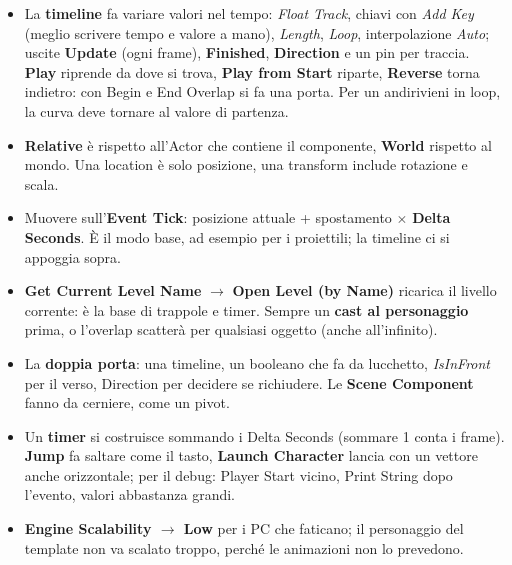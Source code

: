 \begin{itemize}
{        Basic}, poi duplicati con Ctrl+C, Ctrl+V. \textbf{Fab}: asset, plugin,
        progetti completi; filtrare per formato Unreal Engine e gratuito; tre
        pacchetti gratuiti a tempo ogni quindici giorni; gli asset vanno
        \textbf{solo avanti di versione, mai indietro}.
  \item La \textbf{timeline} fa variare valori nel tempo: \emph{Float Track},
        chiavi con \emph{Add Key} (meglio scrivere tempo e valore a mano),
        \emph{Length}, \emph{Loop}, interpolazione \emph{Auto}; uscite
        \textbf{Update} (ogni frame), \textbf{Finished}, \textbf{Direction} e
        un pin per traccia. \textbf{Play} riprende da dove si trova,
        \textbf{Play from Start} riparte, \textbf{Reverse} torna indietro: con
        Begin e End Overlap si fa una porta. Per un andirivieni in loop, la
        curva deve tornare al valore di partenza.
  \item \textbf{Relative} è rispetto all'Actor che contiene il componente,
        \textbf{World} rispetto al mondo. Una location è solo posizione, una
        transform include rotazione e scala.
  \item Muovere sull'\textbf{Event Tick}: posizione attuale + spostamento
        $\times$ \textbf{Delta Seconds}. È il modo base, ad esempio per i
        proiettili; la timeline ci si appoggia sopra.
  \item \textbf{Get Current Level Name} $\rightarrow$ \textbf{Open Level (by
        Name)} ricarica il livello corrente: è la base di trappole e timer.
        Sempre un \textbf{cast al personaggio} prima, o l'overlap scatterà per
        qualsiasi oggetto (anche all'infinito).
  \item La \textbf{doppia porta}: una timeline, un booleano che fa da lucchetto,
        \emph{IsInFront} per il verso, Direction per decidere se richiudere.
        Le \textbf{Scene Component} fanno da cerniere, come un pivot.
  \item Un \textbf{timer} si costruisce sommando i Delta Seconds (sommare 1
        conta i frame). \textbf{Jump} fa saltare come il tasto,
        \textbf{Launch Character} lancia con un vettore anche orizzontale; per
        il debug: Player Start vicino, Print String dopo l'evento, valori
        abbastanza grandi.
  \item \textbf{Engine Scalability $\rightarrow$ Low} per i PC che faticano;
        il personaggio del template non va scalato troppo, perché le
        animazioni non lo prevedono.
\end{itemize}
